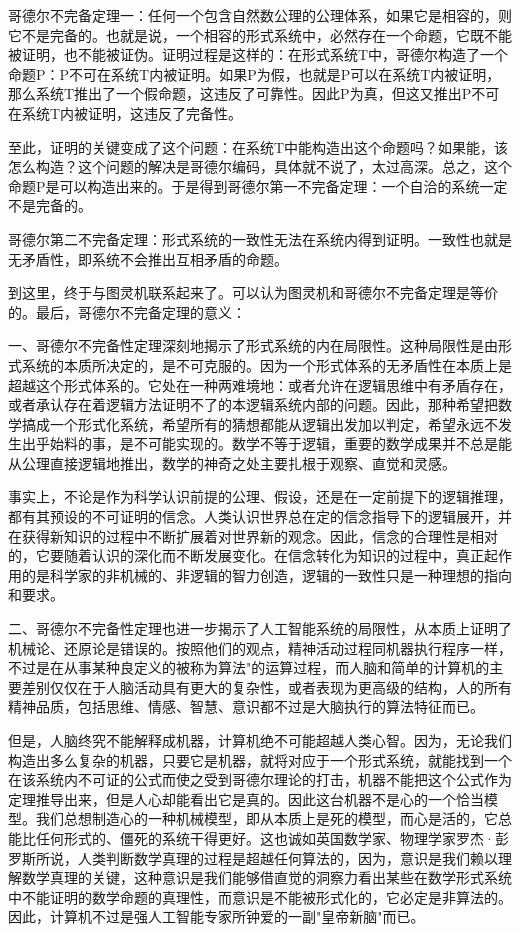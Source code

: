 \documentclass{ctexart}
\begin{document}
	哥德尔不完备定理一：任何一个包含自然数公理的公理体系，如果它是相容的，则它不是完备的。也就是说，一个相容的形式系统中，必然存在一个命题，它既不能被证明，也不能被证伪。证明过程是这样的：在形式系统T中，哥德尔构造了一个命题P：P不可在系统T内被证明。如果P为假，也就是P可以在系统T内被证明，那么系统T推出了一个假命题，这违反了可靠性。因此P为真，但这又推出P不可在系统T内被证明，这违反了完备性。
	
	至此，证明的关键变成了这个问题：在系统T中能构造出这个命题吗？如果能，该怎么构造？这个问题的解决是哥德尔编码，具体就不说了，太过高深。总之，这个命题P是可以构造出来的。于是得到哥德尔第一不完备定理：一个自洽的系统一定不是完备的。
	
	哥德尔第二不完备定理：形式系统的一致性无法在系统内得到证明。一致性也就是无矛盾性，即系统不会推出互相矛盾的命题。
	
	到这里，终于与图灵机联系起来了。可以认为图灵机和哥德尔不完备定理是等价的。最后，哥德尔不完备定理的意义：
	
	一、哥德尔不完备性定理深刻地揭示了形式系统的内在局限性。这种局限性是由形式系统的本质所决定的，是不可克服的。因为一个形式体系的无矛盾性在本质上是超越这个形式体系的。它处在一种两难境地：或者允许在逻辑思维中有矛盾存在，或者承认存在着逻辑方法证明不了的本逻辑系统内部的问题。因此，那种希望把数学搞成一个形式化系统，希望所有的猜想都能从逻辑出发加以判定，希望永远不发生出乎始料的事，是不可能实现的。数学不等于逻辑，重要的数学成果并不总是能从公理直接逻辑地推出，数学的神奇之处主要扎根于观察、直觉和灵感。
	
	事实上，不论是作为科学认识前提的公理、假设，还是在一定前提下的逻辑推理，都有其预设的不可证明的信念。人类认识世界总在定的信念指导下的逻辑展开，并在获得新知识的过程中不断扩展着对世界新的观念。因此，信念的合理性是相对的，它要随着认识的深化而不断发展变化。在信念转化为知识的过程中，真正起作用的是科学家的非机械的、非逻辑的智力创造，逻辑的一致性只是一种理想的指向和要求。
	
	二、哥德尔不完备性定理也进一步揭示了人工智能系统的局限性，从本质上证明了机械论、还原论是错误的。按照他们的观点，精神活动过程同机器执行程序一样，不过是在从事某种良定义的被称为算法"的运算过程，而人脑和简单的计算机的主要差别仅仅在于人脑活动具有更大的复杂性，或者表现为更高级的结构，人的所有精神品质，包括思维、情感、智慧、意识都不过是大脑执行的算法特征而已。
	
	但是，人脑终究不能解释成机器，计算机绝不可能超越人类心智。因为，无论我们构造出多么复杂的机器，只要它是机器，就将对应于一个形式系统，就能找到一个在该系统内不可证的公式而使之受到哥德尔理论的打击，机器不能把这个公式作为定理推导出来，但是人心却能看出它是真的。因此这台机器不是心的一个恰当模型。我们总想制造心的一种机械模型，即从本质上是死的模型，而心是活的，它总能比任何形式的、僵死的系统干得更好。这也诚如英国数学家、物理学家罗杰·彭罗斯所说，人类判断数学真理的过程是超越任何算法的，因为，意识是我们赖以理解数学真理的关键，这种意识是我们能够借直觉的洞察力看出某些在数学形式系统中不能证明的数学命题的真理性，而意识是不能被形式化的，它必定是非算法的。因此，计算机不过是强人工智能专家所钟爱的一副"皇帝新脑"而已。
	
\end{document}
